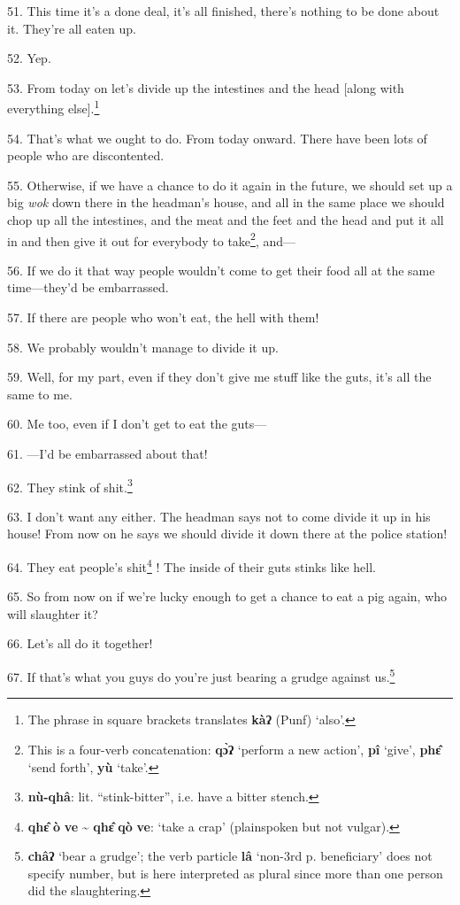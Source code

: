 51. This time it's a done deal, it's all finished, there's nothing to be done about
it. They're all eaten up.

52. Yep.

53. From today on let's divide up the intestines and the head [along with everything
else].\footnote{The phrase in square brackets translates \textbf{kàʔ} (Punf) `also'.}

54. That's what we ought to do. From today onward. There have been lots of people
who are discontented.

55. Otherwise, if we have a chance to do it again in the future, we should set
up a big \textit{wok} down there in the headman's house, and all in the same place
we should chop up all the intestines, and the meat and the feet and the head and
put it all in and then give it out for everybody to take\footnote{This is a four-verb concatenation: \textbf{qɔ̀ʔ} `perform a new action', \textbf{pî} `give', \textbf{phɛ̂} `send forth', \textbf{yù} `take'.}, and---

56. If we do it that way people wouldn't come to get their food all at the same
time---they'd be embarrassed.

57. If there are people who won't eat, the hell with them!

58. We probably wouldn't manage to divide it up.

59. Well, for my part, even if they don't give me stuff like the guts, it's all
the same to me.

60. Me too, even if I don't get to eat the guts---

61. ---I'd be embarrassed about that!

62. They stink of shit.\footnote{\textbf{nù-qhâ}: lit. ``stink-bitter'', i.e. have a bitter stench.}

63. I don't want any either. The headman says not to come divide it up in his house!
From now on he says we should divide it down there at the police station!

64. They eat people's shit\footnote{\textbf{qhɛ̂} \textbf{ò} \textbf{ve} \textasciitilde{} \textbf{qhɛ̂} \textbf{qò} \textbf{ve}: `take a crap' (plainspoken but not vulgar).} ! The inside of their
guts stinks like hell.

65. So from now on if we're lucky enough to get a chance to eat a pig again, who
will slaughter it?

66. Let's all do it together!

67. If that's what you guys do you're just bearing a grudge against us.\footnote{\textbf{châʔ} `bear a grudge'; the verb particle \textbf{lâ} `non-3rd p. beneficiary' does not specify number, but is here interpreted as plural since more than one person did the slaughtering.}

